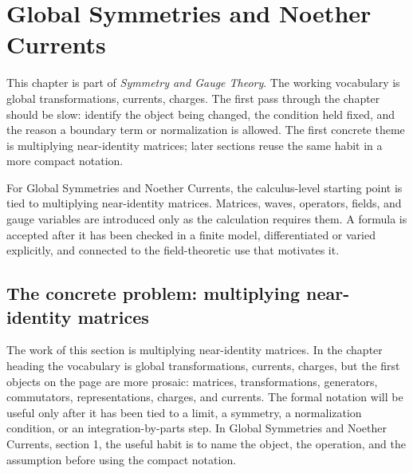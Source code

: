 \chapter{Global Symmetries and Noether Currents}


This chapter is part of \emph{Symmetry and Gauge Theory}.  The working vocabulary is global transformations, currents, charges.  The first pass through the chapter should be slow: identify the object being changed, the condition held fixed, and the reason a boundary term or normalization is allowed.  The first concrete theme is multiplying near-identity matrices; later sections reuse the same habit in a more compact notation.

For Global Symmetries and Noether Currents, the calculus-level starting point is tied to multiplying near-identity matrices.  Matrices, waves, operators, fields, and gauge variables are introduced only as the calculation requires them.  A formula is accepted after it has been checked in a finite model, differentiated or varied explicitly, and connected to the field-theoretic use that motivates it.

\section{The concrete problem: multiplying near-identity matrices}













The work of this section is multiplying near-identity matrices.  In the chapter heading the vocabulary is global transformations, currents, charges, but the first objects on the page are more prosaic: matrices, transformations, generators, commutators, representations, charges, and currents.  The formal notation will be useful only after it has been tied to a limit, a symmetry, a normalization condition, or an integration-by-parts step.  In Global Symmetries and Noether Currents, section 1, the useful habit is to name the object, the operation, and the assumption before using the compact notation.

